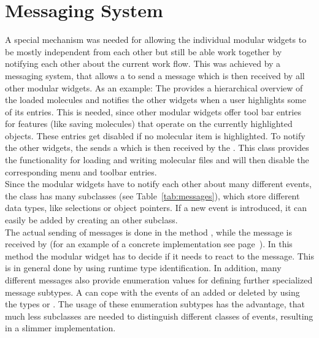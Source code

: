 \section{Messaging System}
\label{message}

A special mechanism was needed for allowing the individual modular widgets to
be mostly independent from each other but still be able work together \ie by
notifying each other about the current work flow. This was achieved by a 
messaging system, that allows a  to send a message which
is then received by all other modular widgets.
As an example: 
The  provides a hierarchical overview of the loaded molecules
and notifies the other widgets when a user highlights some of its entries. 
This is needed, since other modular widgets offer tool bar entries for features (like 
saving molecules) that operate on the currently highlighted objects. 
These entries get disabled if no molecular item is highlighted.
To notify the other widgets, the  sends a 
which is then received by the .
This class provides the functionality for loading and writing molecular files and will 
then disable the corresponding menu and toolbar entries.\\
Since the modular widgets have to notify each other about many different events, the class
 has many subclasses (see Table~\ref{tab:messages}), which store different data
types, like selections or object pointers. 
If a new event is introduced, it can easily be added by creating an other  
subclass.
\\
The actual sending of messages is done in the method , while 
the message is received by  (for an example of a concrete
implementation see page~\pageref{onNotify}).
In this method the modular widget has to decide if it needs to react to the message. 
This is in general done by using runtime type identification. 
In addition, many different messages also provide enumeration values for defining further
specialized message subtypes. 
A  can \eg cope with the events of an added or deleted 
 by using the types  or 
.
The usage of these enumeration subtypes has the advantage, that much less subclasses
are needed to distinguish different classes of events, resulting in a slimmer implementation.

